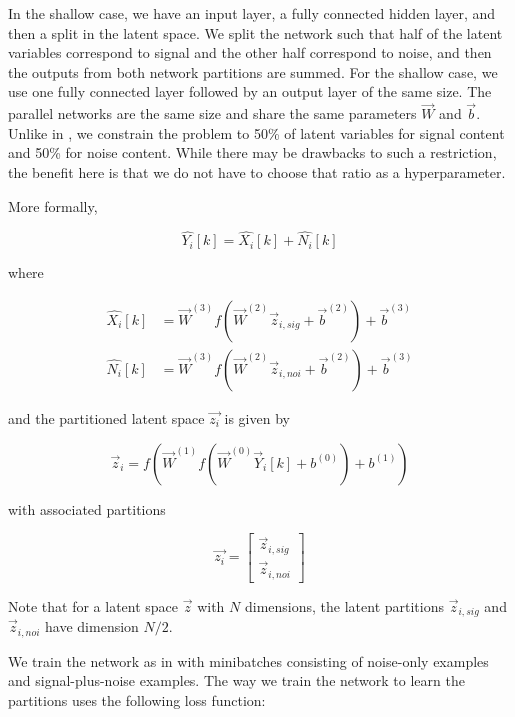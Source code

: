 In the shallow case, we have an input layer, a fully connected hidden layer, and then a split in the latent space. We split the network such that half of the latent variables correspond to signal and the other half correspond to noise, and then the outputs from both network partitions are summed. For the shallow case, we use one fully connected layer followed by an output layer of the same size. The parallel networks are the same size and share the same parameters $\vec{W}$ and $\vec{b}$. Unlike in \cite{stow}, we constrain the problem to 50\% of latent variables for signal content and 50\% for noise content. While there may be drawbacks to such a restriction, the benefit here is that we do not have to choose that ratio as a hyperparameter.

More formally,

\begin{equation}
\hat{Y_i}[k] = \hat{X_i}[k] + \hat{N_i}[k]
\end{equation}

where

\begin{align}
\hat{X_i}[k] &= \vec{W}^{(3)} f(\vec{W}^{(2)} \vec{z}_{i,sig} + \vec{b}^{(2)}) + \vec{b}^{(3)}\\
\hat{N_i}[k] &= \vec{W}^{(3)} f(\vec{W}^{(2)} \vec{z}_{i,noi} + \vec{b}^{(2)}) + \vec{b}^{(3)}
\end{align}

and the partitioned latent space $\vec{z_i}$ is given by

\begin{equation}
\vec{z}_i = f(\vec{W}^{(1)} f(\vec{W}^{(0)} \vec{Y}_{i}[k] + b^{(0)}) + b^{(1)})
\end{equation}

with associated partitions

\begin{equation}
\vec{z_i} =
    \left[
    \begin{array}{c}
        \vec{z}_{i,sig} \\
        \hline
        \vec{z}_{i,noi}
    \end{array}
    \right]
\end{equation}

Note that for a latent space $\vec{z}$ with $N$ dimensions, the latent partitions $\vec{z}_{i,sig}$ and $\vec{z}_{i,noi}$ have dimension $N/2$.

We train the network as in \cite{stow} with minibatches consisting of noise-only examples and signal-plus-noise examples. The way we train the network to learn the partitions uses the following loss function:

